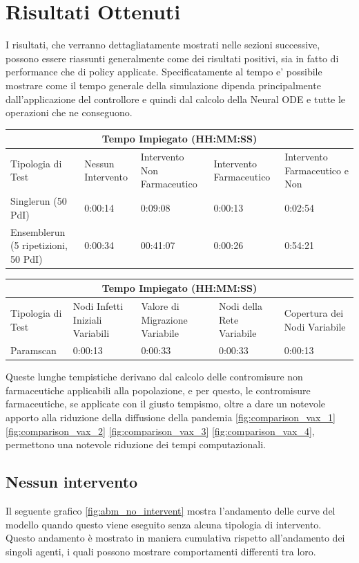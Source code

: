 \section{Risultati Ottenuti}
I risultati, che verranno dettagliatamente mostrati nelle sezioni successive, possono essere riassunti generalmente
come dei risultati positivi, sia in fatto di performance che di policy applicate. Specificatamente 
al tempo e' possibile mostrare come il tempo generale della simulazione dipenda principalmente dall'applicazione
del controllore e quindi dal calcolo della Neural ODE e tutte le operazioni che ne conseguono. 

\begin{tabular}{ |p{}||p{}|p{}|p{}|p{}|  }
	\hline
	\multicolumn{5}{|c|}{Tempo Impiegato (HH:MM:SS)} \\
	\hline
	Tipologia di Test & Nessun Intervento & Intervento Non Farmaceutico & Intervento Farmaceutico & Intervento Farmaceutico e Non\\
	\hline
	Singlerun (50 PdI) & 0:00:14 & 0:09:08 & 0:00:13 & 0:02:54\\
	Ensemblerun (5 ripetizioni, 50 PdI) & 0:00:34 & 00:41:07 & 0:00:26 & 0:54:21\\
	\hline
\end{tabular}

\begin{tabular}{ |p{}||p{}|p{}|p{}|p{}|  }
	\hline
	\multicolumn{5}{|c|}{Tempo Impiegato (HH:MM:SS)} \\
	\hline
	Tipologia di Test & Nodi Infetti Iniziali Variabili & Valore di Migrazione Variabile & Nodi della Rete Variabile & Copertura dei Nodi Variabile\\
	\hline
	Paramscan & 0:00:13 & 0:00:33 & 0:00:33 & 0:00:13\\
	\hline
\end{tabular}

Queste lunghe tempistiche derivano dal calcolo delle contromisure non farmaceutiche applicabili alla popolazione, 
e per questo, le contromisure farmaceutiche, se applicate con il giusto tempismo, oltre a dare un notevole 
apporto alla riduzione della diffusione della pandemia \ref{fig:comparison_vax_1} \ref{fig:comparison_vax_2}
\ref{fig:comparison_vax_3} \ref{fig:comparison_vax_4}, permettono una notevole riduzione dei tempi computazionali.
\newpage

\subsection{Nessun intervento}
Il seguente grafico \ref{fig:abm_no_intervent} mostra l'andamento delle curve del modello
quando questo viene eseguito senza alcuna tipologia di intervento. Questo andamento è mostrato 
in maniera cumulativa rispetto all'andamento dei singoli agenti, i quali possono mostrare comportamenti 
differenti tra loro.

